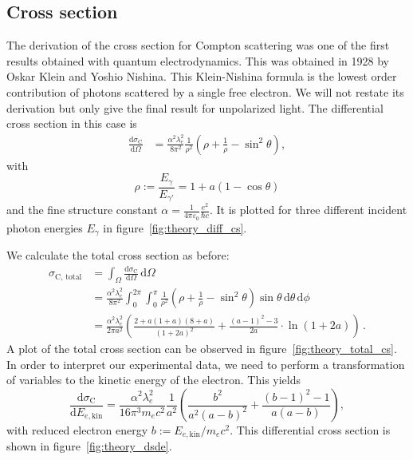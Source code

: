 \subsection{Cross section}
\label{sec:cross_section}
The derivation of the cross section for Compton scattering was one of the first results obtained with quantum 
electrodynamics. This was obtained in 1928 by Oskar Klein and Yoshio Nishina. This Klein-Nishina formula is the lowest 
order contribution of photons scattered by a single free electron. We will not restate its derivation 
but only give the final result for unpolarized light. The differential cross section in this case 
is\cite{schmueser2011feynman}
\begin{equation}
    \begin{split}
        \frac{\text{d} \sigma_\text{C}}{\text{d} \Omega} 
        &= \frac{\alpha^2 \lambda_e^2}{8 \pi^2} \frac{1}{\rho^2}\left(\rho + \frac{1}{\rho} - \sin^2\theta\right) ,
        \label{eq:kn_diff}
    \end{split}
\end{equation}
with 
\begin{equation}
    \rho := \frac{E_\gamma}{E_{\gamma'}}  = 1 + a(1 - \cos\theta) 
    \label{eq:rho}
\end{equation}
and the fine structure constant $\alpha = \frac{1}{4 \pi \varepsilon_0} \frac{e^2}{\hbar c}$.   
It is plotted for three different incident photon energies $E_\gamma$ in figure~\ref{fig:theory_diff_cs}. 

We calculate the total cross section as before:\cite{ver2}
\begin{equation}
    \begin{split}
        \sigma_\text{C, total} &= \int_\Omega \! \frac{\text{d} \sigma_\text{C}}{\text{d} \Omega}  \, \text{d}\Omega \\
            &= \frac{\alpha^2 \lambda_e^2}{8\pi^2} \int_0^{2\pi} \! \int_0^{\pi} \! 
        \frac{1}{\rho^2}\left(\rho + \frac{1}{\rho} - \sin^2\theta\right) \sin\theta \, \text{d}\theta  \, \text{d}\phi \\
        &=\frac{\alpha^2 \lambda_e^2}{2\pi a^2} \left(
            \frac{2 + a(1 + a)(8 + a)}{(1 + 2a)^2} + 
            \frac{(a - 1)^2 - 3}{2a} \cdot \ln(1 + 2a)\right)   \,.
        \label{eq:total_compton}
    \end{split}
\end{equation}
A plot of the total cross section can be observed in figure~\ref{fig:theory_total_cs}. In order to interpret our 
experimental data, we need to perform a transformation of variables to the kinetic energy of the electron. This 
yields\cite{ver2}
\begin{equation}
    \frac{\text{d} \sigma_\text{C}}{\text{d} E_{e, \text{kin}}} 
    = \frac{\alpha^2 \lambda_e^2}{16 \pi^3 m_e c^2}  \frac{1}{a^2}\left(
        \frac{b^2}{a^2(a - b)^2} + \frac{(b - 1)^2 - 1}{a (a - b)} \right) ,
    \label{eq:dode}
\end{equation}
with reduced electron energy $b := E_{e, \text{kin}} / m_ec^2$. This differential cross section is shown in 
figure~\ref{fig:theory_dsde}.

